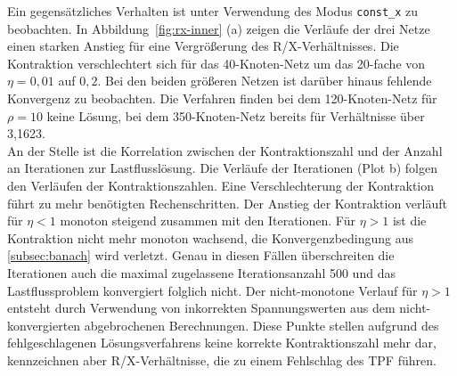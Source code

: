 
Ein gegensätzliches Verhalten ist unter Verwendung des Modus \texttt{const\_x} zu beobachten.
In Abbildung~\ref{fig:rx-inner} (a) zeigen die Verläufe der drei Netze einen starken Anstieg für eine Vergrößerung des R/X-Verhältnisses.
Die Kontraktion verschlechtert sich für das 40-Knoten-Netz um das 20-fache von $\eta=0{,}01$ auf $0{,}2$.
Bei den beiden größeren Netzen ist darüber hinaus fehlende Konvergenz zu beobachten.
Die Verfahren finden bei dem 120-Knoten-Netz für $\rho=10$ keine Lösung, bei dem 350-Knoten-Netz bereits für Verhältnisse über 3,1623.\\

An der Stelle ist die Korrelation zwischen der Kontraktionszahl und der Anzahl an Iterationen zur Lastflusslösung.
Die Verläufe der Iterationen (Plot b) folgen den Verläufen der Kontraktionszahlen.
Eine Verschlechterung der Kontraktion führt zu mehr benötigten Rechenschritten.
Der Anstieg der Kontraktion verläuft für $\eta < 1 $ monoton steigend zusammen mit den Iterationen. 
Für $\eta>1$ ist die Kontraktion nicht mehr monoton wachsend, die Konvergenzbedingung aus \cref{subsec:banach} wird verletzt.
Genau in diesen Fällen überschreiten die Iterationen auch die maximal zugelassene Iterationsanzahl 500 und das Lastflussproblem konvergiert folglich nicht.
Der nicht-monotone Verlauf für $\eta>1$ entsteht durch Verwendung von inkorrekten Spannungswerten aus dem nicht-konvergierten abgebrochenen Berechnungen. 
Diese Punkte stellen aufgrund des fehlgeschlagenen Lösungsverfahrens keine korrekte Kontraktionszahl mehr dar, kennzeichnen aber R/X-Verhältnisse, die zu einem Fehlschlag des TPF führen.\\

